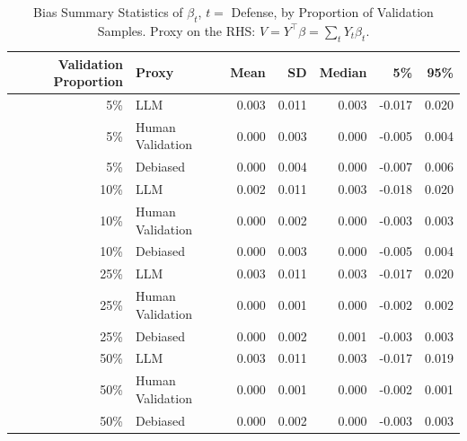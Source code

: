 \begin{table}

\caption{\label{tab:unnamed-chunk-1}Bias Summary Statistics of $\beta_{t}$, $t=$ Defense, by Proportion of Validation Samples.
      Proxy on the RHS: $V = Y^\top \beta = \sum_{t} Y_t \beta_t$.}
\centering
\begin{tabular}[t]{rlrrrrr}
\toprule
Validation Proportion & Proxy & Mean & SD & Median & 5\% & 95\%\\
\midrule
5\% & LLM & 0.003 & 0.011 & 0.003 & -0.017 & 0.020\\
5\% & Human Validation & 0.000 & 0.003 & 0.000 & -0.005 & 0.004\\
5\% & Debiased & 0.000 & 0.004 & 0.000 & -0.007 & 0.006\\
10\% & LLM & 0.002 & 0.011 & 0.003 & -0.018 & 0.020\\
10\% & Human Validation & 0.000 & 0.002 & 0.000 & -0.003 & 0.003\\
10\% & Debiased & 0.000 & 0.003 & 0.000 & -0.005 & 0.004\\
25\% & LLM & 0.003 & 0.011 & 0.003 & -0.017 & 0.020\\
25\% & Human Validation & 0.000 & 0.001 & 0.000 & -0.002 & 0.002\\
25\% & Debiased & 0.000 & 0.002 & 0.001 & -0.003 & 0.003\\
50\% & LLM & 0.003 & 0.011 & 0.003 & -0.017 & 0.019\\
50\% & Human Validation & 0.000 & 0.001 & 0.000 & -0.002 & 0.001\\
50\% & Debiased & 0.000 & 0.002 & 0.000 & -0.003 & 0.003\\
\bottomrule
\end{tabular}
\end{table}
